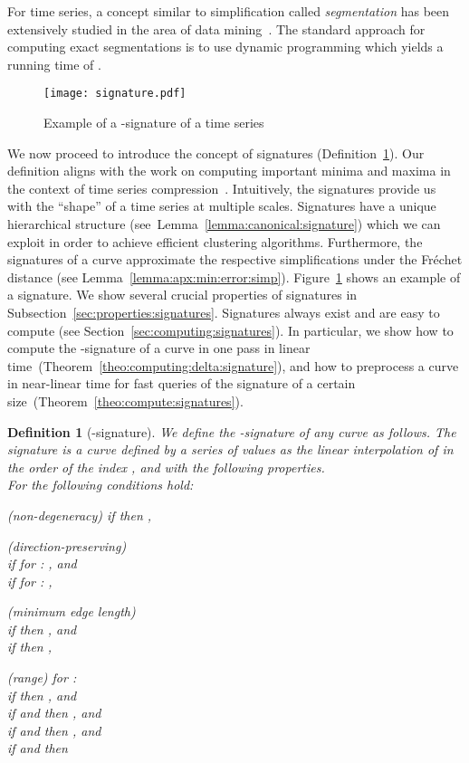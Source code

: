 \documentclass[11pt, letter]{article}
\newtheorem{definition}[theorem]{Definition}
\newcommand{\secref}[1]{Section~\ref{sec:#1}}
\newcommand{\subsecref}[1]{Subsection~\ref{sec:#1}}
\newcommand{\thmref}[1]{Theorem~\ref{theo:#1}}
\newcommand{\lemref}[1]{Lemma~\ref{lemma:#1}}
\newcommand{\figlab}[1]{\label{fig:#1}}
\newcommand{\figref}[1]{Figure~\ref{fig:#1}}
\newcommand{\deflab}[1]{\label{def:#1}}
\newcommand{\defref}[1]{Definition~\ref{def:#1}}
\newcommand{\Frechet}{Fr\'echet\xspace}
\begin{document}
For time series, a concept similar to simplification  called 
\emph{segmentation} has been extensively studied in the area of data
mining~\cite{bingham2006segmentation,himberg01,terzi2006efficient}.
The standard approach for computing exact segmentations is to use dynamic
programming which yields a running time of .




\begin{figure}[h]
\centering
\texttt{[image: signature.pdf]}
\caption{Example of a -signature of a time series}
\figlab{signature}
\end{figure}

We now proceed to introduce the concept of signatures (\defref{signature}).  Our definition
aligns with the work on computing important minima and
maxima in the context of time series compression~\cite{pratt2002search}.
Intuitively, the signatures provide us with the ``shape'' of a time series at
multiple scales.  Signatures have a unique hierarchical structure
(see~\lemref{canonical:signature}) which we can exploit in order to achieve
efficient clustering algorithms. Furthermore, the signatures of a curve
approximate the respective simplifications under the \Frechet distance (see \lemref{apx:min:error:simp}).
\figref{signature} shows an example of a signature. We show several crucial
properties of signatures in \subsecref{properties:signatures}.  Signatures
always exist and are easy to compute (see \secref{computing:signatures}).  In
particular, we show how to compute the -signature of a curve in one pass
in linear time~(\thmref{computing:delta:signature}), and how to preprocess a
curve in near-linear time for fast queries of the signature of a certain
size~(\thmref{compute:signatures}). 

\begin{definition}[-signature]\deflab{signature}
We define the -signature of any 
curve  as follows.
The signature is a curve  defined by a series of values  as the linear interpolation of  in the order of the index , and with the following properties.\\ 
For  the following conditions hold: 
\begin{compactenum}[(i)]
\item (non-degeneracy) if  then ,
\item (direction-preserving)\\if  for :
, and \\if  for : ,
\item (minimum edge length)\\if  then , and \\if
 then ,
\item (range) for : \\if 
 then , and \\if 
 and  then , and \\if 
  and  then , and \\if
 and  then 
\end{compactenum}
\end{definition}
\end{document}
